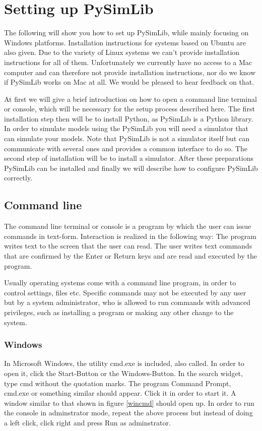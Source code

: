 \section{Setting up PySimLib}

The following will show you how to set up PySimLib, while mainly focusing on Windows platforms.
Installation instructions for systems based on Ubuntu are also given.
Due to the variety of Linux systems we can't provide installation instructions for all of them.
Unfortunately we currently have no access to a Mac computer and can therefore not provide installation instructions, nor do we know if PySimLib works on Mac at all.
We would be pleased to hear feedback on that.

At first we will give a brief introduction on how to open a command line terminal or console, which will be necessary for the setup process described here.
The first installation step then will be to install Python, as PySimLib is a Python library.
In order to simulate models using the PySimLib you will need a simulator that can simulate your models.
Note that PySimLib is not a simulator itself but can communicate with several ones and provides a common interface to do so.
The second step of installation will be to install a simulator.
After these preparations PySimLib can be installed and finally we will describe how to configure PySimLib correctly.




\subsection{Command line}

The command line terminal or console is a program by which the user can issue commands in text-form.
Interaction is realized in the following way:
The program writes text to the screen that the user can read.
The user writes text commands that are confirmed by the \grqq{}Enter\grqq{} or \grqq{}Return\grqq{} keys and are read and executed by the program.

Usually operating systems come with a command line program, in order to control settings, files etc.
Specific commands may not be executed by any user but by a system administrator, who is allowed to run commands with advanced privileges, such as installing a program or making any other change to the system.

\subsubsection{Windows}
In Microsoft Windows, the utility cmd.exe is included, also called.
In order to open it, click the \grqq{}Start\grqq{}-Button or the Windows-Button.
In the search widget, type \grqq{}cmd\grqq{} without the quotation marks.
The program \grqq{}Command Prompt\grqq{}, \grqq{}cmd.exe\grqq{} or something similar should appear.
Click it in order to start it.
A window similar to that shown in figure \ref{wincmd} should open up.
In order to run the console in adminstrator mode, repeat the above process but instead of doing a left click, click right and press \grqq{}Run as adminstrator\grqq{}.

